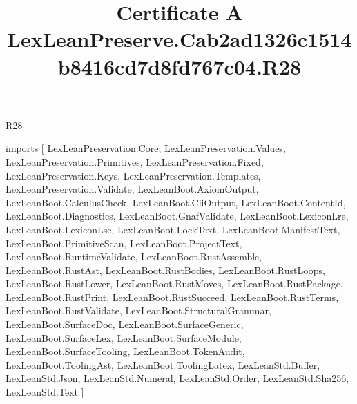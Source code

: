 \begin{lexlean}{R28}
\title{Certificate A LexLeanPreserve.Cab2ad1326c1514b8416cd7d8fd767c04.R28}
\begin{coremodule}
imports [
  LexLeanPreservation.Core,
  LexLeanPreservation.Values,
  LexLeanPreservation.Primitives,
  LexLeanPreservation.Fixed,
  LexLeanPreservation.Keys,
  LexLeanPreservation.Templates,
  LexLeanPreservation.Validate,
  LexLeanBoot.AxiomOutput,
  LexLeanBoot.CalculusCheck,
  LexLeanBoot.CliOutput,
  LexLeanBoot.ContentId,
  LexLeanBoot.Diagnostics,
  LexLeanBoot.GnafValidate,
  LexLeanBoot.LexiconLre,
  LexLeanBoot.LexiconLse,
  LexLeanBoot.LockText,
  LexLeanBoot.ManifestText,
  LexLeanBoot.PrimitiveScan,
  LexLeanBoot.ProjectText,
  LexLeanBoot.RuntimeValidate,
  LexLeanBoot.RustAssemble,
  LexLeanBoot.RustAst,
  LexLeanBoot.RustBodies,
  LexLeanBoot.RustLoops,
  LexLeanBoot.RustLower,
  LexLeanBoot.RustMoves,
  LexLeanBoot.RustPackage,
  LexLeanBoot.RustPrint,
  LexLeanBoot.RustSucceed,
  LexLeanBoot.RustTerms,
  LexLeanBoot.RustValidate,
  LexLeanBoot.StructuralGrammar,
  LexLeanBoot.SurfaceDoc,
  LexLeanBoot.SurfaceGeneric,
  LexLeanBoot.SurfaceLex,
  LexLeanBoot.SurfaceModule,
  LexLeanBoot.SurfaceTooling,
  LexLeanBoot.TokenAudit,
  LexLeanBoot.ToolingAst,
  LexLeanBoot.ToolingLatex,
  LexLeanStd.Buffer,
  LexLeanStd.Json,
  LexLeanStd.Numeral,
  LexLeanStd.Order,
  LexLeanStd.Sha256,
  LexLeanStd.Text
]


\end{coremodule}
\end{lexlean}

